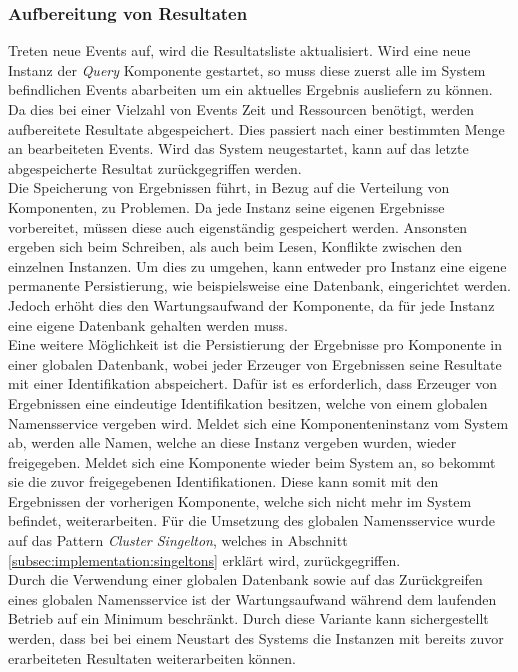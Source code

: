 \subsubsection{Aufbereitung von Resultaten}
\label{subsubsub:implementation:queryActorModel:resultPreparator}
Treten neue Events auf, wird die Resultatsliste aktualisiert. Wird eine neue Instanz der \textit{Query} Komponente gestartet, so muss diese zuerst alle im System befindlichen Events abarbeiten um ein aktuelles Ergebnis ausliefern zu können. Da dies bei einer Vielzahl von Events Zeit und Ressourcen benötigt, werden aufbereitete Resultate abgespeichert. Dies passiert nach einer bestimmten Menge an bearbeiteten Events. Wird das System neugestartet, kann auf das letzte abgespeicherte Resultat zurückgegriffen werden.\\
Die Speicherung von Ergebnissen führt, in Bezug auf die Verteilung von Komponenten, zu Problemen. Da jede Instanz seine eigenen Ergebnisse vorbereitet, müssen diese auch eigenständig gespeichert werden. Ansonsten ergeben sich beim Schreiben, als auch beim Lesen, Konflikte zwischen den einzelnen Instanzen. Um dies zu umgehen, kann entweder pro Instanz eine eigene permanente Persistierung, wie beispielsweise eine Datenbank, eingerichtet werden. Jedoch erhöht dies den Wartungsaufwand der Komponente, da für jede Instanz eine eigene Datenbank gehalten werden muss. \\
Eine weitere Möglichkeit ist die Persistierung der Ergebnisse pro Komponente in einer globalen Datenbank, wobei jeder Erzeuger von Ergebnissen seine Resultate mit einer Identifikation abspeichert. Dafür ist es erforderlich, dass Erzeuger von Ergebnissen eine eindeutige Identifikation besitzen, welche von einem globalen Namensservice vergeben wird. Meldet sich eine Komponenteninstanz vom System ab, werden alle Namen, welche an diese Instanz vergeben wurden, wieder freigegeben. Meldet sich eine Komponente wieder beim System an, so bekommt sie die zuvor freigegebenen Identifikationen. Diese kann somit mit den Ergebnissen der vorherigen Komponente, welche sich nicht mehr im System befindet, weiterarbeiten. Für die Umsetzung des globalen Namensservice wurde auf das Pattern \textit{Cluster Singelton}, welches in Abschnitt \ref{subsec:implementation:singeltons} erklärt wird, zurückgegriffen. \\
Durch die Verwendung einer globalen Datenbank sowie auf das Zurückgreifen eines globalen Namensservice ist der Wartungsaufwand während dem laufenden Betrieb auf ein Minimum beschränkt. Durch diese Variante kann sichergestellt werden, dass bei bei einem Neustart des Systems die Instanzen mit bereits zuvor erarbeiteten Resultaten weiterarbeiten können. 

